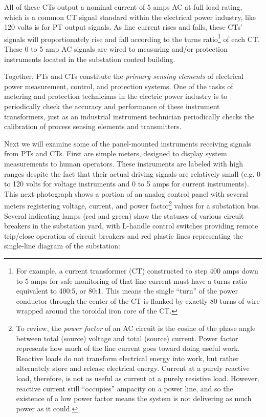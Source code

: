 All of these CTs output a nominal current of 5 amps AC at full load rating, which is a common CT signal standard within the electrical power industry, like 120 volts is for PT output signals.  As line current rises and falls, these CTs' signals will proportionately rise and fall according to the turns ratio\footnote{For example, a current transformer (CT) constructed to step 400 amps down to 5 amps for safe monitoring of that line current must have a turns ratio equivalent to 400:5, or 80:1.  This means the single ``turn'' of the power conductor through the center of the CT is flanked by exactly 80 turns of wire wrapped around the toroidal iron core of the CT.} of each CT.  These 0 to 5 amp AC signals are wired to measuring and/or protection instruments located in the substation control building.

\vskip 10pt

Together, PTs and CTs constitute the \textit{primary sensing elements} of electrical power measurement, control, and protection systems.  One of the tasks of metering and protection technicians in the electric power industry is to periodically check the accuracy and performance of these instrument transformers, just as an industrial instrument technician periodically checks the calibration of process sensing elements and transmitters.

\vskip 10pt

\filbreak

Next we will examine some of the panel-mounted instruments receiving signals from PTs and CTs.  First are simple meters, designed to display system measurements to human operators.  These instruments are labeled with high ranges despite the fact that their actual driving signals are relatively small (e.g. 0 to 120 volts for voltage instruments and 0 to 5 amps for current instruments).  This next photograph shows a portion of an analog control panel with several meters registering voltage, current, and power factor\footnote{To review, the \textit{power factor} of an AC circuit is the cosine of the phase angle between total (source) voltage and total (source) current.  Power factor represents how much of the line current goes toward doing useful work.  Reactive loads do not transform electrical energy into work, but rather alternately store and release electrical energy.  Current at a purely reactive load, therefore, is not as useful as current at a purely resistive load.  However, reactive current still ``occupies'' ampacity on a power line, and so the existence of a low power factor means the system is not delivering as much power as it could.} values for a substation bus.  Several indicating lamps (red and green) show the statuses of various circuit breakers in the substation yard, with L-handle control switches providing remote trip/close operation of circuit breakers and red plastic lines representing the single-line diagram of the substation:

